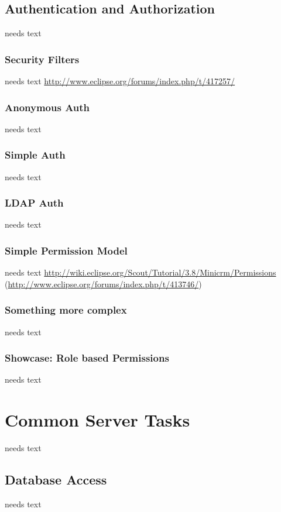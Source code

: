 \documentclass[a4paper,10pt,twoside]{book}
\begin{document}
\section{Authentication and Authorization}
needs text

\subsection{Security Filters}
needs text
\url{http://www.eclipse.org/forums/index.php/t/417257/}

\subsection{Anonymous Auth}
needs text

\subsection{Simple Auth}
needs text

\subsection{LDAP Auth}
needs text

\subsection{Simple Permission Model}
needs text
\url{http://wiki.eclipse.org/Scout/Tutorial/3.8/Minicrm/Permissions} (\url{http://www.eclipse.org/forums/index.php/t/413746/})

\subsection{Something more complex}
needs text

\subsection{Showcase: Role based Permissions}
needs text

\chapter{Common Server Tasks}
needs text
  
\section{Database Access}
needs text
\end{document}
